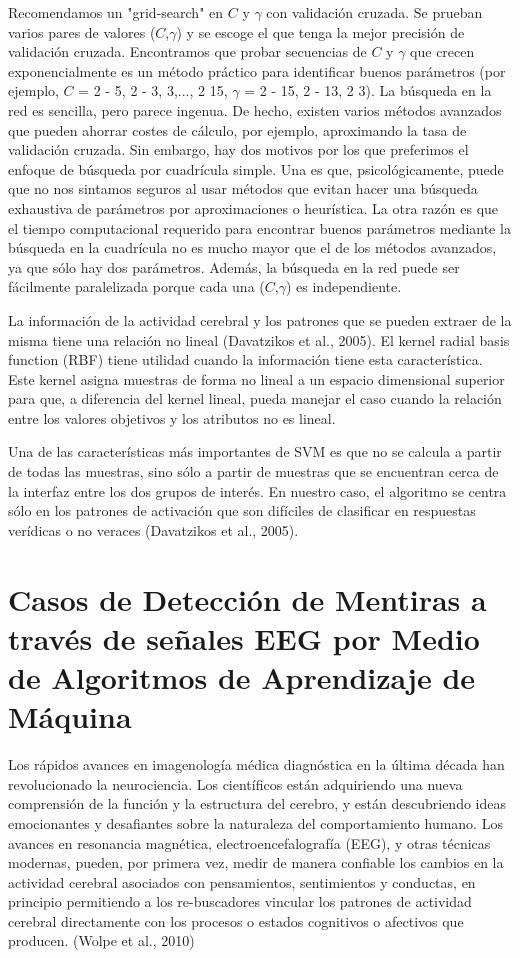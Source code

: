 Recomendamos un "grid-search" en $C$ y $\gamma$ con validación cruzada.  Se prueban varios pares de valores ($C$,$\gamma$) y se escoge el que tenga la mejor precisión de validación cruzada.    Encontramos que probar secuencias de $C$ y $\gamma$ que crecen exponencialmente es un método práctico para identificar buenos parámetros (por ejemplo, $C$ = 2 - 5, 2 - 3, 3,..., 2 15, $\gamma$ = 2 - 15, 2 - 13, 2 3). La búsqueda en la red es sencilla, pero parece ingenua.   De hecho, existen varios métodos avanzados que pueden ahorrar costes de cálculo, por ejemplo, aproximando la tasa de validación cruzada. Sin embargo, hay dos motivos por los que preferimos el enfoque de búsqueda por cuadrícula simple. Una es que, psicológicamente, puede que no nos sintamos seguros al usar métodos que evitan hacer una búsqueda exhaustiva de parámetros por aproximaciones o heurística.   La otra razón es que el tiempo computacional requerido para encontrar buenos parámetros mediante la búsqueda en la cuadrícula no es mucho mayor que el de los métodos avanzados, ya que sólo hay dos parámetros.   Además, la búsqueda en la red puede ser fácilmente paralelizada porque cada una ($C$,$\gamma$) es independiente.

La información de la actividad cerebral y los patrones que se pueden extraer de la misma tiene una relación no lineal (Davatzikos et al., 2005). El kernel radial basis function (RBF) tiene utilidad cuando la información tiene esta característica. Este kernel asigna muestras de forma no lineal a un espacio dimensional superior para que, a diferencia del kernel lineal, pueda manejar el caso cuando la relación entre los valores objetivos y los atributos no es lineal. 

Una de las características más importantes de SVM es que no se calcula a partir de todas las muestras, sino sólo a partir de muestras que se encuentran cerca de la interfaz entre los dos grupos de interés. En nuestro caso, el algoritmo se centra sólo en los patrones de activación que son difíciles de clasificar en respuestas verídicas o no veraces (Davatzikos et al., 2005).

\section{Casos de Detección de Mentiras a través de señales EEG por Medio de Algoritmos de Aprendizaje de Máquina}
Los rápidos avances en imagenología médica diagnóstica en la última década han revolucionado la neurociencia. Los científicos están adquiriendo una nueva comprensión de la función y la estructura del cerebro, y están descubriendo ideas emocionantes y desafiantes sobre la naturaleza del comportamiento humano. Los avances en resonancia magnética, electroencefalografía (EEG), y otras técnicas modernas, pueden, por primera vez, medir de manera confiable los cambios en la actividad cerebral asociados con pensamientos, sentimientos y conductas, en principio permitiendo a los re-buscadores vincular los patrones de actividad cerebral directamente con los procesos o estados cognitivos o afectivos que producen. (Wolpe et al., 2010)

